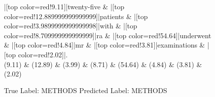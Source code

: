\documentclass[a4paper, landscape]{article}
\begin{document}
\begin{figure}
\begin{center}
\begin{dependency}
\begin{deptext}
|[top color=red!9.11]|twenty-five \& |[top color=red!12.889999999999999]|patients \& |[top color=red!3.9899999999999998]|with \& |[top color=red!8.709999999999999]|ra \& |[top color=red!54.64]|underwent \& |[top color=red!4.84]|mr \& |[top color=red!3.81]|examinations \& |[top color=red!2.02]|.\\
(9.11) \& (12.89) \& (3.99) \& (8.71) \& (54.64) \& (4.84) \& (3.81) \& (2.02)\\
\end{deptext}
\end{dependency}
\end{center}
\caption{True Label: METHODS Predicted Label: METHODS}
\end{figure}
\clearpage
\end{document}
